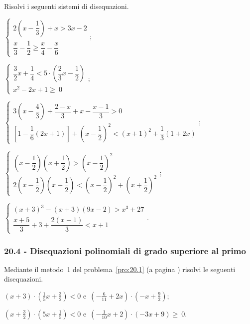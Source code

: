 \begin{esercizio}[\Ast]
 \label{ese:20.44}
 Risolvi i seguenti sistemi di disequazioni.

 \begin{enumeratea}
 \item {\longarray $\left\{\begin{array}{l}
	2\left(x-\dfrac{1}{3}\right)+x>3x-2\\
	\dfrac{x}{3}-\dfrac{1}{2}\ge \dfrac{x}{4}-\dfrac{x}{6}
   \end{array}\right.;$}
\item $\left\{\begin{array}{l}
    \dfrac{3}{2}x+\dfrac{1}{4}<5\cdot\left(\dfrac{2}{3}x-\dfrac{1}{2}\right)\\
    x^2-2x+1\ge~0
   \end{array}\right.;$
\item {\longarray $\left\{\begin{array}{l}
	3\left(x-\dfrac{4}{3}\right)+\dfrac{2-x}{3}+x-\dfrac{x-1}{3}>0\\
	\left[1-\dfrac{1}{6}(2x+1)\right]+\left(x-\dfrac{1}{2}\right)^{2}<(x+1)^{2}+\dfrac{1}{3}(1+2x)
   \end{array}\right.;$}
\item {\longarray $\left\{\begin{array}{l}
	\left(x-\dfrac{1}{2}\right)\left(x+\dfrac{1}{2}\right)>\left(x-\dfrac{1}{2}\right)^{2}\\
	2\left(x-\dfrac{1}{2}\right)\left(x+\dfrac{1}{2}\right)<\left(x-\dfrac{1}{2}\right)^{2}+\left(x+\dfrac{1}{2}\right)^{2}
   \end{array}\right.;$}
\item {\longarray $\left\{\begin{array}{l}
  (x+3)^{3}-(x+3)(9x-2)>x^{3}+27\\
  \dfrac{x+5}{3}+3+\dfrac{2(x-1)}{3}<x+1
 \end{array}\right..$}
 \end{enumeratea}
\end{esercizio}

\subsubsection*{20.4 - Disequazioni polinomiali di grado superiore al primo}
\begin{esercizio}
 \label{ese:20.45}
 Mediante il metodo~1 del problema~\ref{pro:20.1} (a pagina \pageref{pro:20.1}) risolvi le seguenti disequazioni.

\begin{enumeratea}
\item $(x+3)\cdot \left(\frac{1}{5}x+\frac{3}{2}\right)<0$ e~$\left(-{\frac{6}{11}}+2x\right)\cdot\left(-x+\frac{9}{2}\right)$;
\item $\left(x+\frac{3}{2}\right)\cdot \left(5x+\frac{1}{5}\right)<0$ e~$\left(-{\frac{1}{10}}x+2\right)\cdot \left(-3x+9\right)\ge~0$.
\end{enumeratea}

\end{esercizio}

